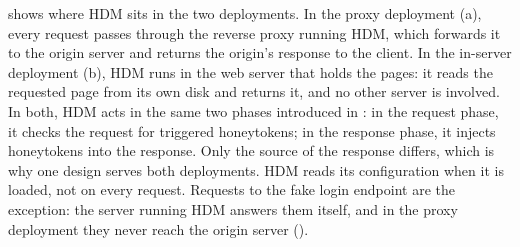 \documentclass{rptuma}
\begin{document}
 shows where HDM sits in the two deployments. In the proxy deployment
(a), every request passes through the reverse proxy running HDM, which forwards it to the origin
server and returns the origin's response to the client. In the in-server deployment (b), HDM runs in the web
server that holds the pages: it reads the requested page from its own disk and
returns it, and no other server is involved. In both, HDM acts in the same two phases introduced in
: in the request phase, it checks the request for triggered honeytokens;
in the response phase, it injects honeytokens into the response. Only the source of the response
differs, which is why one design serves both deployments. HDM reads its configuration when it is
loaded, not on every request. Requests to the fake login endpoint are the exception: the server
running HDM answers them itself, and in the proxy deployment they never reach the origin server
().
\end{document}
